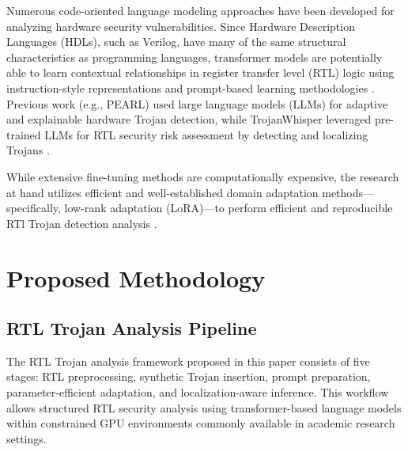 \documentclass[conference]{IEEEtran}
\begin{document}
Numerous code-oriented language modeling approaches have been developed for analyzing hardware security vulnerabilities. Since Hardware Description Languages (HDLs), such as Verilog, have many of the same structural characteristics as programming languages, transformer models are potentially able to learn contextual relationships in register transfer level (RTL) logic using instruction-style representations and prompt-based learning methodologies \cite{vaswani2017attention}. Previous work (e.g., PEARL) used large language models (LLMs) for adaptive and explainable hardware Trojan detection, while TrojanWhisper leveraged pre-trained LLMs for RTL security risk assessment by detecting and localizing Trojans \cite{kundu2025pearl,trojanwhisper}.

While extensive fine-tuning methods are computationally expensive, the research at hand utilizes efficient and well-established domain adaptation methods---specifically, low-rank adaptation (LoRA)---to perform efficient and reproducible RTl Trojan detection analysis \cite{lora}.



\section{Proposed Methodology}
\label{sec:methodology}




\subsection{RTL Trojan Analysis Pipeline}
\label{subsec:rtl_pipeline}

The RTL Trojan analysis framework proposed in this paper consists of five stages: RTL preprocessing, synthetic Trojan insertion, prompt preparation, parameter-efficient adaptation, and localization-aware inference. This workflow allows structured RTL security analysis using transformer-based language models within constrained GPU environments commonly available in academic research settings.
\end{document}
